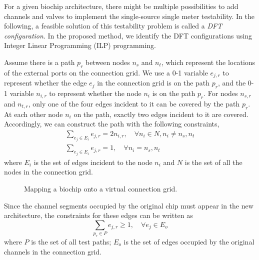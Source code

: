 For a given biochip architecture, there might be multiple possibilities to add
channels and valves to implement the single-source single meter testability.
In the following, a feasible solution of this testability problem is called a
\textit{DFT configuration}. In the proposed method, we identify the DFT
configurations using Integer Linear Programming (ILP) programming.

Assume there is a path $p_r$ between nodes $n_{s}$ and $n_{t}$, which
represent the locations of the external ports 
on the connection grid. We use a 0-1 variable $e_{j,r}$ to represent whether
the edge $e_j$ in the connection grid is on the path $p_r$, and the 0-1
variable $n_{i,r}$ to represent whether the node $n_i$ is on the path $p_r$.
For nodes $n_{s,r}$ and $n_{t,r}$, only one of the four edges incident to it 
can be covered by the path $p_r$.  
At each other node $n_i$ on the path, exactly two edges incident to it are
covered.  Accordingly, we can construct the path with the following
constraints,
\begin{align}\label{eq:path_construct} 
 \sum_{e_j\in E_i}e_{j,r} = 2n_{i,r} ,\quad \forall n_i\in N, n_i \ne n_{s}, n_{t}\\ 
  \sum_{e_j\in E_i}e_{j,r} = 1, \quad  \forall n_i = n_{s}, n_{t}
\end{align}
where 
$E_i$ is the set of edges incident to the node 
$n_i$ and $N$ is the set
of all the nodes in the connection grid.

\begin{figure}
\figurefontsize
\centering

\caption{Mapping a biochip onto a virtual connection grid.}
\label{fig:fitintogrid}
\end{figure}


Since the channel segments occupied by the original chip must appear in the new
architecture, the constraints for these edges can be written as
\begin{equation}\label{eq:edge_cover}
\sum_{p_r\in P} e_{j,r}\ge 1,\quad \forall e_j\in E_{o} 
\end{equation}
where $P$ is the set of all test paths; $E_{o}$ is the set 
of edges occupied by the original channels in the connection grid.

